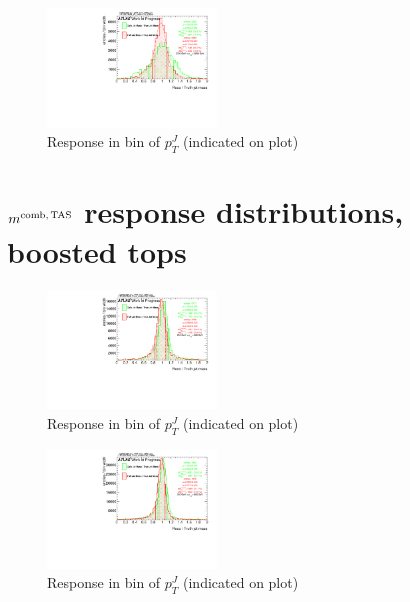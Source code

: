 \begin{figure}

\includegraphics[width=0.4\textwidth]{appendixB/mTASCOMB_W_calibmCal_030ro_20:38:43-03-11-2016/8ResponsePTJ_h_JetRatio_mJ12CALO.pdf}
\caption{Response in bin of  $p_{T}^{J}$ (indicated on plot)} 

\end{figure}

\clearpage
\onecolumn
\vspace*{\fill}
\section{$m^\textrm{comb,\,TAS}$ response distributions, boosted tops}
\vfill
\clearpage
\twocolumn
 \clearpage %
\begin{figure}

\includegraphics[width=0.4\textwidth]{appendixB/mTASCOMB_Tops_calibmCal_030ro_20:20:52-03-11-2016/8ResponsePTJ_h_JetRatio_mJ01CALO.pdf}
\caption{Response in bin of  $p_{T}^{J}$ (indicated on plot)} 

\end{figure}

\begin{figure}

\includegraphics[width=0.4\textwidth]{appendixB/mTASCOMB_Tops_calibmCal_030ro_20:20:52-03-11-2016/8ResponsePTJ_h_JetRatio_mJ02CALO.pdf}
\caption{Response in bin of  $p_{T}^{J}$ (indicated on plot)} 

\end{figure}

